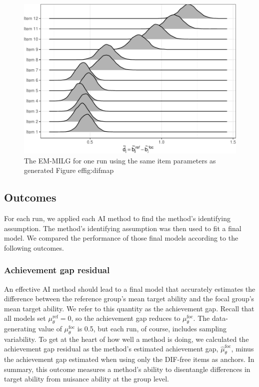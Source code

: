 \documentclass[
  11pt,
]{article}
\begin{document}
\begin{figure}[H]

{\centering \includegraphics[width=0.7\linewidth]{paper_files/figure-latex/simemmlg-1} 

}

\caption{The EM-MILG for one run using the same item parameters as generated Figure ef{fig:difmap}}\label{fig:simemmlg}
\end{figure}

\hypertarget{outcomes}{%
\subsection{Outcomes}\label{outcomes}}

For each run, we applied each AI method to find the method's identifying assumption. The method's identifying assumption was then used to fit a final model. We compared the performance of those final models according to the following outcomes.

\hypertarget{achievement-gap-residual}{%
\subsubsection{Achievement gap residual}\label{achievement-gap-residual}}

An effective AI method should lead to a final model that accurately estimates the difference between the reference group's mean target ability and the focal group's mean target ability. We refer to this quantity as the achievement gap. Recall that all models set \(\mu_\theta^\text{ref} = 0\), so the achievement gap reduces to \(\mu_\theta^\text{foc}\). The data-generating value of \(\mu_\theta^\text{foc}\) is 0.5, but each run, of course, includes sampling variability. To get at the heart of how well a method is doing, we calculated the achievement gap residual as the method's estimated achievement gap, \(\hat\mu_\theta^\text{foc}\), minus the achievement gap estimated when using only the DIF-free items as anchors. In summary, this outcome measures a method's ability to disentangle differences in target ability from nuisance ability at the group level.
\end{document}
